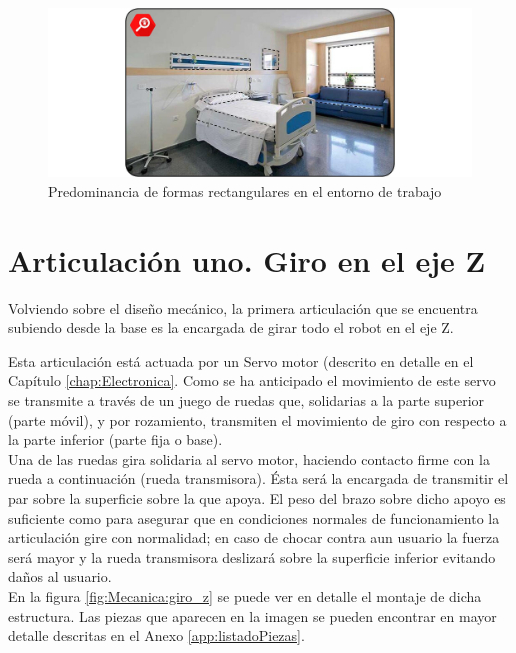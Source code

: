     \begin{figure}[H]
        \centering
        \includegraphics[width=\textwidth]{figuras/Imagenes_Mecanica/verdad_de_formas.jpg}
        \caption{Predominancia de formas rectangulares en el entorno de trabajo}
        \label{fig:Mecanica:verdad_formas}
    \end{figure}

\section{Articulación uno. Giro en el eje Z} \label{sec:Mecanica:articulacion_uno}

    Volviendo sobre el diseño mecánico, la primera articulación que se encuentra subiendo desde la base es la encargada de girar todo el robot en el eje Z.

    Esta articulación está actuada por un Servo motor (descrito en detalle en el Capítulo \ref{chap:Electronica}. Como se ha anticipado el movimiento de este servo se transmite a través de un juego de ruedas que, solidarias a la parte superior (parte móvil), y por rozamiento, transmiten el movimiento de giro con respecto a la parte inferior (parte fija o base).
    \\

    Una de las ruedas gira solidaria al servo motor, haciendo contacto firme con la rueda a continuación (rueda transmisora). Ésta será la encargada de transmitir el par sobre la superficie sobre la que apoya. El peso del brazo sobre dicho apoyo es suficiente como para asegurar que en condiciones normales de funcionamiento la articulación gire con normalidad; en caso de chocar contra aun usuario la fuerza será mayor y la rueda transmisora deslizará sobre la superficie inferior evitando daños al usuario.
	\\
	En la figura \ref{fig:Mecanica:giro_z} se puede ver en detalle el montaje de dicha estructura. Las piezas que aparecen en la imagen se pueden encontrar en mayor detalle descritas en el Anexo \ref{app:listadoPiezas}.

